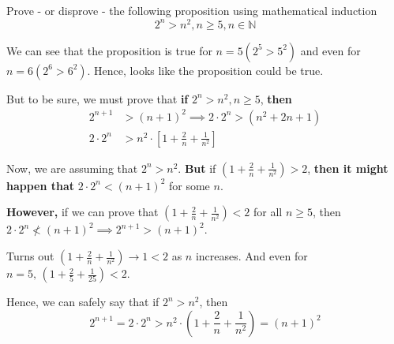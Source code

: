 
\question Prove - or disprove - the following proposition using mathematical induction 
\[ 2^n > n^2, n\geq 5, n\in\mathbb{N} \]

\insertQR{}

\begin{solution}
  We can see that the proposition is true for $n=5 (2^5 > 5^2)$ and even for 
  $n=6 (2^6 > 6^2)$. Hence, looks like the proposition could be true. 

  But to be sure, we must prove that \textbf{if} $2^n > n^2, n\geq 5$, \textbf{then}
  \begin{align}
    2^{n+1} &> (n+1)^2\implies 2\cdot 2^n > (n^2 + 2n + 1) \\
    2\cdot 2^n &> n^2\cdot\left[ 1 + \frac{2}{n} + \frac{1}{n^2} \right]
  \end{align}

  Now, we are assuming that $2^n > n^2$. \textbf{But} if $\left(1 + \frac{2}{n} + \frac{1}{n^2} \right) > 2$, 
  \textbf{then it might happen that} $2\cdot 2^n < (n+1)^2$ for some $n$. 

  \textbf{However,} if we can prove that $\left( 1 + \frac{2}{n} + \frac{1}{n^2}\right) < 2$ 
  for all $n\geq 5$, then $2\cdot 2^n \nless(n+1)^2\implies 2^{n+1} > (n+1)^2$.

  Turns out $\left( 1 + \frac{2}{n} + \frac{1}{n^2} \right)\rightarrow 1 < 2$ as $n$ increases.  
  And even for $n=5,\, \left( 1 + \frac{2}{5} + \frac{1}{25}\right) < 2$. 

  Hence, we can safely say that if $2^n > n^2$, then 
  \[ 2^{n+1} = 2\cdot 2^n > n^2\cdot\left( 1 + \frac{2}{n} + \frac{1}{n^2}\right) = (n+1)^2 \]
\end{solution}


